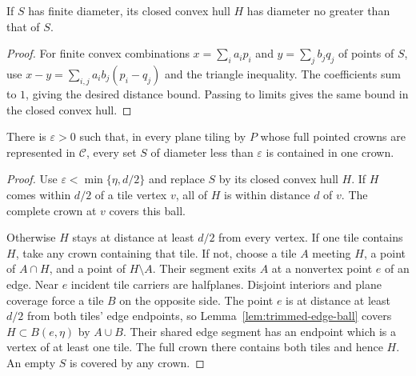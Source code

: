 \begin{lemma}
\label{lem:crown-convexification}
If $S$ has finite diameter, its closed convex hull $H$ has diameter no
greater than that of $S$.
\end{lemma}
\begin{proof}
For finite convex combinations $x=\sum_i a_i p_i$ and
$y=\sum_j b_j q_j$ of points of $S$, use
$x-y=\sum_{i,j}a_i b_j(p_i-q_j)$ and the triangle inequality.
The coefficients sum to $1$, giving the desired distance bound.
Passing to limits gives the same bound in the closed convex hull.
\end{proof}

\begin{lemma}
\label{lem:crown-cover-plane}
There is $\varepsilon>0$ such that, in every plane tiling by $P$ whose
full pointed crowns are represented in $\mathcal C$, every set $S$ of
diameter less than $\varepsilon$ is contained in one crown.
\end{lemma}
\begin{proof}
Use $\varepsilon<\min\{\eta,d/2\}$ and replace $S$ by its closed convex
hull $H$.  If $H$ comes within $d/2$ of a tile vertex $v$, all of $H$ is
within distance $d$ of $v$.  The complete crown at $v$ covers this ball.

Otherwise $H$ stays at distance at least $d/2$ from every vertex.  If one
tile contains $H$, take any crown containing that tile.  If not, choose
a tile $A$ meeting $H$, a point of $A\cap H$, and a point of $H\setminus A$.
Their segment exits $A$ at a nonvertex point $e$ of an edge.  Near $e$
incident tile carriers are halfplanes.  Disjoint interiors and plane
coverage force a tile $B$ on the opposite side.  The point $e$ is at
distance at least $d/2$ from both tiles' edge endpoints, so
Lemma~\ref{lem:trimmed-edge-ball} covers $H\subset B(e,\eta)$ by $A\cup B$.
Their shared edge segment has an endpoint which is a vertex of at least
one tile.  The full crown there contains both tiles and hence $H$.
An empty $S$ is covered by any crown.
\end{proof}

